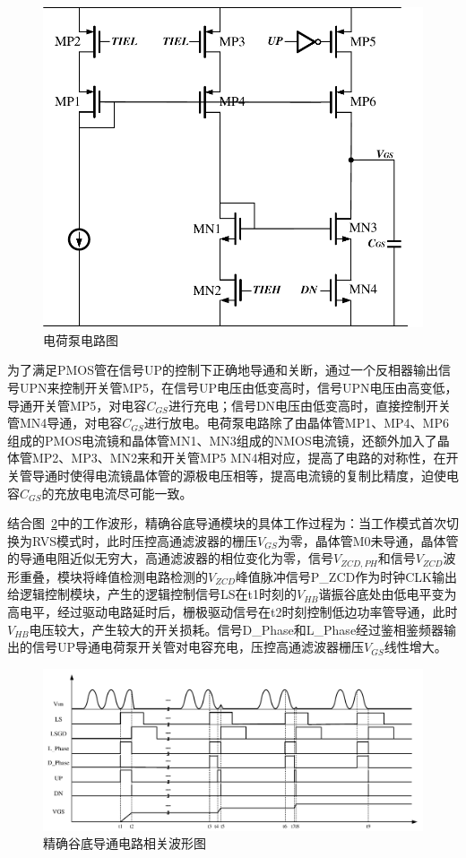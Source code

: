 \begin{figure}[htbp] 
    \centering
    \includegraphics[width=0.7\linewidth]{figures/电荷泵电路图.pdf}
    \caption{电荷泵电路图}
    \label{fig:电荷泵电路图}
\end{figure} 

为了满足PMOS管在信号UP的控制下正确地导通和关断，通过一个反相器输出信号UPN来控制开关管MP5，在信号UP电压由低变高时，信号UPN电压由高变低，导通开关管MP5，对电容$C_{GS}$进行充电；信号DN电压由低变高时，直接控制开关管MN4导通，对电容$C_{GS}$进行放电。电荷泵电路除了由晶体管MP1、MP4、MP6组成的PMOS电流镜和晶体管MN1、MN3组成的NMOS电流镜，还额外加入了晶体管MP2、MP3、MN2来和开关管MP5 MN4相对应，提高了电路的对称性，在开关管导通时使得电流镜晶体管的源极电压相等，提高电流镜的复制比精度，迫使电容$C_{GS}$的充放电电流尽可能一致。


结合图~\ref{fig:精确谷底导通波形图}中的工作波形，精确谷底导通模块的具体工作过程为：当工作模式首次切换为RVS模式时，此时压控高通滤波器的栅压$V_{GS}$为零，晶体管M0未导通，晶体管的导通电阻近似无穷大，高通滤波器的相位变化为零，信号$V_{ZCD,PH}$和信号$V_{ZCD}$波形重叠，模块将峰值检测电路检测的$V_{ZCD}$峰值脉冲信号P\_ZCD作为时钟CLK输出给逻辑控制模块，产生的逻辑控制信号LS在t1时刻的$V_{HB}$谐振谷底处由低电平变为高电平，经过驱动电路延时后，栅极驱动信号在t2时刻控制低边功率管导通，此时$V_{HB}$电压较大，产生较大的开关损耗。信号D\_Phase和L\_Phase经过鉴相鉴频器输出的信号UP导通电荷泵开关管对电容充电，压控高通滤波器栅压$V_{GS}$线性增大。

\begin{figure}[htbp] 
    \centering
    \includegraphics[width=1.0\linewidth]{figures/精确谷底导通波形图.pdf}
    \caption{精确谷底导通电路相关波形图}
    \label{fig:精确谷底导通波形图}
\end{figure} 


